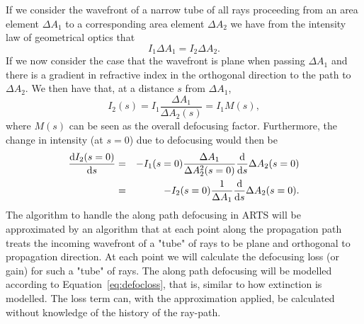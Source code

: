 If we consider the wavefront of a narrow tube of all rays proceeding from an
area element \(\Delta A_{1}\) to a corresponding area element \(\Delta A_{2}\)
we have from the intensity law of geometrical optics that
\begin{equation}
I_{1}\Delta A_{1}=I_{2} \Delta A_{2}.
\end{equation}
If we now consider the case that the wavefront is plane when passing \(\Delta
A_{1}\) and there is a gradient in refractive index in the orthogonal direction
to the path to \(\Delta A_{2}\). We then have that, at a distance \(s\) from
\(\Delta A_{1}\),
\begin{equation}
I_{2}(s)=I_{1}\frac{\Delta A_{1}}{\Delta A_{2}(s)}=I_{1}M(s),
\end{equation}
where \(M(s)\) can be seen as the overall defocusing factor. Furthermore, the
change in intensity (at \(s=0\)) due to defocusing would then be
\begin{eqnarray}
\label{eq:defocloss}
\frac{\mathrm{d} I_{2}(s=0)}{\mathrm{d} s} &=&
-I_{1}(s=0)\frac{\Delta A_{1}}{\Delta A_{2}^{2}(s=0)}\frac{\mathrm{d}}{\mathrm{d} s}\Delta A_{2}(s=0)  \nonumber \\
&=& 
-I_{2}(s=0)\frac{1}{\Delta A_{1}}\frac{\mathrm{d}}{\mathrm{d} s}\Delta A_{2}(s=0).
\end{eqnarray}
The algorithm to handle the along path defocusing in ARTS will be approximated
by an algorithm that at each point along the propagation path treats the
incoming wavefront of a "tube" of rays to be plane and orthogonal to
propagation direction. At each point we will calculate the defocusing loss (or
gain) for such a "tube" of rays. The along path defocusing will be modelled
according to Equation~\ref{eq:defocloss}, that is, similar to how extinction is
modelled. The loss term can, with the approximation applied, be calculated
without knowledge of the history of the ray-path.


